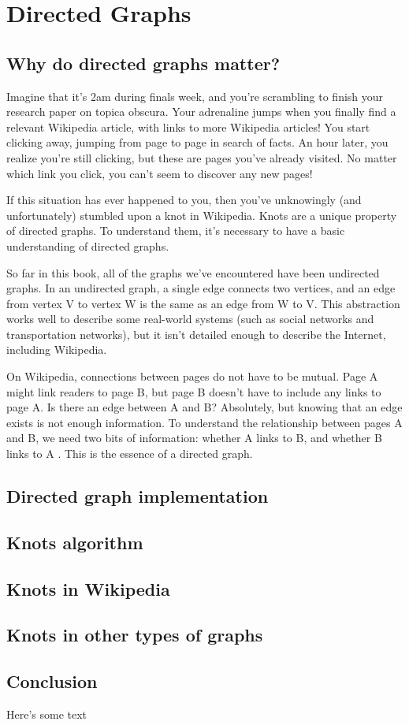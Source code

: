 \documentclass[10pt]{book}
\begin{document}
\chapter {Directed Graphs}
\section{Why do directed graphs matter?}
Imagine that it’s 2am during finals week, and you’re scrambling to finish your research paper on topica obscura. Your adrenaline jumps when you finally find a relevant Wikipedia article, with links to more Wikipedia articles! You start clicking away, jumping from page to page in search of facts. An hour later, you realize you’re still clicking, but these are pages you’ve already visited. No matter which link you click, you can’t seem to discover any new pages! 

If this situation has ever happened to you, then you’ve unknowingly (and unfortunately) stumbled upon a knot in Wikipedia. Knots are a unique property of directed graphs. To understand them, it’s necessary to have a basic understanding of directed graphs.
	 	 	
So far in this book, all of the graphs we’ve encountered have been undirected graphs. In an undirected graph, a single edge connects two vertices, and an edge from vertex V to vertex W is the same as an edge from W to V. This abstraction works well to describe some real-world systems (such as social networks and transportation networks), but it isn’t detailed enough to describe the Internet, including Wikipedia. 

On Wikipedia, connections between pages do not have to be mutual. Page A might link readers to page B, but page B doesn’t have to include any links to page A. Is there an edge between A and B? Absolutely, but knowing that an edge exists is not enough information. To understand the relationship between pages A and B, we need two bits of information: whether A links to B, and whether B links to A . This is the essence of a directed graph.
\section{Directed graph implementation}
\section{Knots algorithm}
\section{Knots in Wikipedia}
\section{Knots in other types of graphs}
\section{Conclusion}
Here's some text
\end{document}
